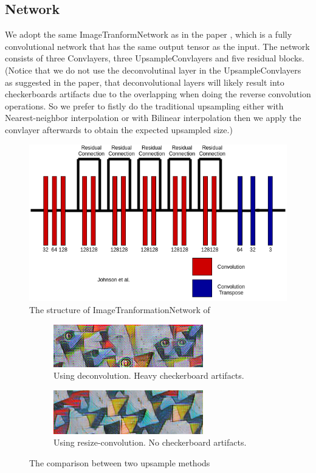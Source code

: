 \documentclass[a4paper,12pt,twoside]{report}
\begin{document}
\subsection{Network}
We adopt the same ImageTranformNetwork as in the paper \cite{johnson2016perceptual}, which is a fully convolutional network that has the same output tensor as the input. The network consists of three Convlayers, three UpsampleConvlayers and five residual blocks.(Notice that we do not use the deconvolutinal layer in the UpsampleConvlayers as suggested in the paper\cite{odena2016deconvolution}, that deconvolutional layers will likely result into checkerboards artifacts due to the overlapping when doing the reverse convolution operations. So we prefer to fistly do the traditional upsampling either with Nearest-neighbor interpolation or with Bilinear interpolation then we apply the convlayer afterwards to obtain the expected upsampled size.)
\begin{figure}
  \centering
  \includegraphics[scale=0.5]{ITN.png}
  \caption{The structure of ImageTranformationNetwork of \cite{johnson2016perceptual}}
\end{figure}
\begin{figure}
\centering
\begin{subfigure}{0.5\textwidth}
  \centering
  \includegraphics[scale=1]{style_artifacts.png}
  \caption{Using deconvolution. Heavy checkerboard artifacts.}
\end{subfigure}
\begin{subfigure}{0.5\textwidth}
  \centering
  \includegraphics[scale=1]{style_clean.png}
  \caption{Using resize-convolution. No checkerboard artifacts.}
\end{subfigure}
\caption{The comparison between two upsample methods\cite{odena2016deconvolution}}
\end{figure}
\end{document}
